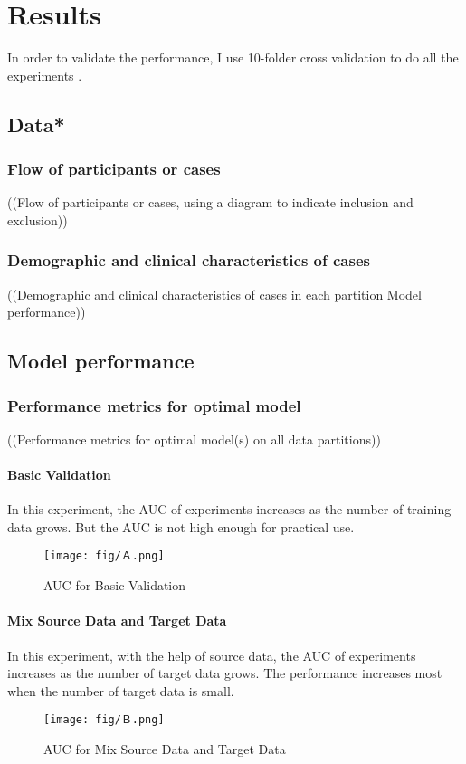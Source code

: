 \chapter{Results}
In order to validate the performance, I use 10-folder cross validation to do all the experiments .

\section{Data*}
\subsection{Flow of participants or cases}
((Flow of participants or cases, using a diagram to indicate inclusion and exclusion)) \\

\subsection{Demographic and clinical characteristics of cases}
((Demographic and clinical characteristics of cases in each partition
Model performance)) \\

\section{Model performance}
\subsection{Performance metrics for optimal model}
((Performance metrics for optimal model(s) on all data partitions)) \\

\subsubsection{Basic Validation}
In this experiment, the AUC of experiments increases as the number of training data grows. But the AUC is not high enough for practical use.
\begin{figure}[H]
    \hfil
    \begin{minipage}[t]{0.9\textwidth}
        \texttt{[image: fig/Ａ.png]}
        \caption{\label{fig:parallel1} AUC for Basic Validation}
    \end{minipage}
    \hfil
\end{figure}
\subsubsection{Mix Source Data and Target Data}
In this experiment, with the help of source data, the AUC of experiments increases as the number of target data grows. The performance increases most when the number of target data is small.
\begin{figure}[H]
    \hfil
    \begin{minipage}[t]{0.9\textwidth}
        \texttt{[image: fig/Ｂ.png]}
        \caption{\label{fig:parallel1} AUC for Mix Source Data and Target Data}
    \end{minipage}
    \hfil
\end{figure}
